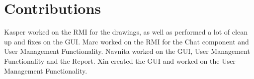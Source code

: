 \chapter{Contributions}
Kasper worked on the RMI for the drawings, as well as performed a lot of clean up and fixes on the GUI.
Marc worked on the RMI for the Chat component and User Management Functionality.
Navnita worked on the GUI, User Management Functionality and the Report.
Xin created the GUI and worked on the User Management Functionality.
